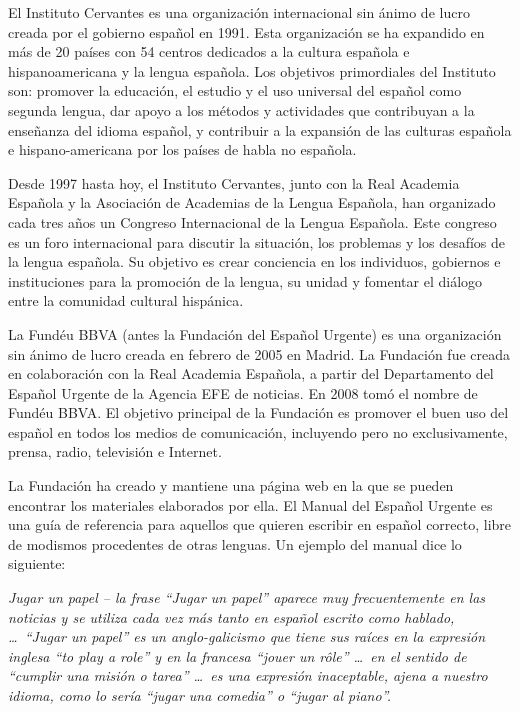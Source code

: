 \begin{multicols}{2}
El Instituto Cervantes es una organización internacional sin ánimo de lucro creada por el gobierno español en 1991. Esta organización se ha expandido en más de 20 países con 54 centros dedicados a la cultura española e hispanoamericana y la lengua española. Los objetivos primordiales del Instituto son: promover la educación, el estudio y el uso universal del español como segunda lengua, dar apoyo a los métodos y actividades que contribuyan a la enseñanza del idioma español, y contribuir a la expansión de las culturas española e hispano-americana por los países de habla no española.

Desde 1997 hasta hoy, el Instituto Cervantes, junto con la Real Academia Española y la Asociación de Academias de la Lengua Española, han organizado cada tres años un Congreso Internacional de la Lengua Española. Este congreso es un foro internacional para discutir la situación, los problemas y los desafíos de la lengua española. Su objetivo es crear conciencia en los individuos, gobiernos e instituciones para la promoción de la lengua, su unidad y fomentar el diálogo entre la comunidad cultural hispánica.


La Fundéu BBVA (antes la Fundación del Español Urgente) \cite{fundeu} es una organización sin ánimo de lucro creada en febrero de 2005 en Madrid. La Fundación fue creada en colaboración con la Real Academia Española, a partir del Departamento del Español Urgente de la Agencia EFE de noticias. En 2008 tomó el nombre de Fundéu BBVA. El objetivo principal de la Fundación es promover el buen uso del español en todos los medios de comunicación, incluyendo pero no exclusivamente, prensa, radio, televisión e Internet.

La Fundación ha creado y mantiene una página web en la que se pueden encontrar los materiales elaborados por ella. El Manual del Español Urgente es una guía de referencia para aquellos que quieren escribir en español correcto, libre de modismos procedentes de otras lenguas. Un ejemplo del manual dice lo siguiente:

\textit{Jugar un papel -- la frase ``Jugar un papel'' aparece muy frecuentemente en las noticias y se utiliza cada vez más tanto en español escrito como hablado, \dots\  ``Jugar un papel'' es un anglo-galicismo que tiene sus raíces en la expresión inglesa ``to play a role'' y en la francesa ``jouer un rôle'' \dots\ en el sentido de ``cumplir una misión o tarea'' \dots\ es una expresión inaceptable, ajena a nuestro idioma, como lo sería ``jugar una comedia'' o ``jugar al piano''.}


\end{multicols}
